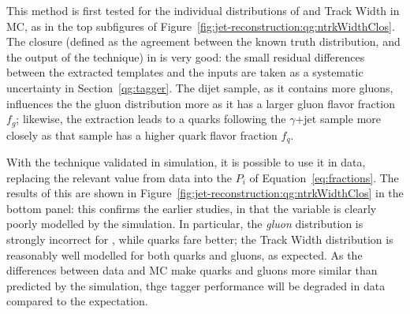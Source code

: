 This method is first tested for the individual distributions of \ntrk and Track Width in MC, as in the top subfigures of Figure~\ref{fig:jet-reconstruction:qg:ntrkWidthClos}. The closure (defined as the agreement between the known truth distribution, and the output of the technique) in \Pythia is very good: the small residual differences between the extracted templates and the inputs are taken as a systematic uncertainty in Section~\ref{qg:tagger}. The dijet sample, as it contains more gluons, influences the the gluon distribution more as it has a larger gluon flavor fraction $f_g$; likewise, the extraction leads to a quarks following the $\gamma$+jet sample more closely as that sample has a higher quark flavor fraction $f_q$. 

With the technique validated in simulation, it is possible to use it in data, replacing the relevant value from data into the $P_i$ of Equation~\ref{eq:fractions}. The results of this are shown in Figure~\ref{fig:jet-reconstruction:qg:ntrkWidthClos} in the bottom panel: this confirms the earlier studies, in that the \ntrk variable is clearly poorly modelled by the simulation. In particular, the \textit{gluon} distribution is strongly incorrect for \ntrk, while quarks fare better; the Track Width distribution is reasonably well modelled for both quarks and gluons, as expected. As the differences between data and MC make quarks and gluons more similar than predicted by the simulation, thge tagger performance will be degraded in data compared to the \Pythia expectation.


\begin{figure*}[p]
\begin{center}
 \\
\caption{ Average (a,c) \ntrk and (b,d) Track Width for quark- (solid symbols) and gluon-jets
(open symbols) as a function of reconstructed jet $\pt$ for isolated jets with $|\eta|<0.8$.
Results are shown for distributions obtained using the template extraction method in
 simulation (black circles, (a,b)) or data (black circles, (c,d)), as well as for 
labeled jets in the dijet sample (triangles) and in the $\gamma$+jet sample (squares).
The error bars represent only statistical uncertainties. Isolated jets are reconstructed using the
\akt jet algorithm with radius parameter $R=0.4$. The bottom panels show
the ratio of the results obtained with the in-situ extraction method to the results
in the dijet and $\gamma$+jet MC samples. }
\label{fig:jet-reconstruction:qg:ntrkWidthClos}
\end{center}
\end{figure*}

